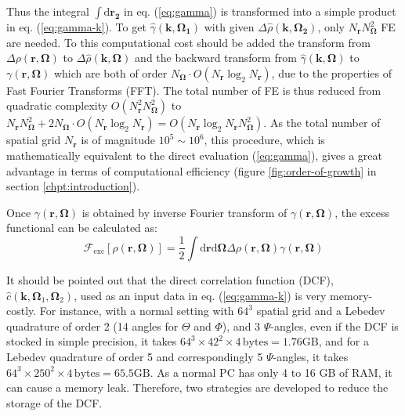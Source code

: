 Thus the integral $\int\mathrm{d}\mathbf{r_{2}}$ in eq. (\ref{eq:gamma})
is transformed into a simple product in eq. (\ref{eq:gamma-k}). To
get $\hat{\gamma}(\mathbf{k},\mathbf{\Omega_{1}})$ with given $\Delta\hat{\rho}(\mathbf{k},\mathbf{\Omega_{2}})$,
only $N_{\mathbf{r}}N_{\mathbf{\Omega}}^{2}$ FE are needed. To this
computational cost should be added the transform from $\Delta\rho(\mathbf{r},\mathbf{\Omega})$
to $\Delta\hat{\rho}(\mathbf{k},\mathbf{\Omega})$ and the backward
transform from $\hat{\gamma}(\mathbf{k},\mathbf{\Omega})$ to $\gamma(\mathbf{r},\mathbf{\Omega})$
which are both of order $N_{\mathbf{\Omega}}\cdot O(N_{\mathbf{r}}\log_{2}N_{\mathbf{r}})$,
due to the properties of Fast Fourier Transforms (FFT). The total
number of FE is thus reduced from quadratic complexity $O(N_{\mathbf{r}}^{2}N_{\mathbf{\Omega}}^{2})$
to $N_{\mathbf{r}}N_{\mathbf{\Omega}}^{2}+2N_{\mathbf{\Omega}}\cdot O(N_{\mathbf{r}}\log_{2}N_{\mathbf{r}})=O(N_{\mathbf{r}}\log_{2}N_{\mathbf{r}}N_{\mathbf{\Omega}}^{2})$.
As the total number of spatial grid $N_{\mathbf{r}}$ is of magnitude
$10^{5}\sim10^{6}$, this procedure, which is mathematically equivalent
to the direct evaluation (\ref{eq:gamma}), gives a great advantage
in terms of computational efficiency (figure \ref{fig:order-of-growth}
in section \ref{chpt:introduction}).

Once $\gamma(\mathbf{r},\mathbf{\Omega})$ is obtained by inverse
Fourier transform of $\gamma(\mathbf{r},\mathbf{\Omega})$, the excess
functional can be calculated as:
\begin{equation}
\mathcal{F}_{\mathrm{exc}}[\rho(\mathbf{r},\mathbf{\Omega})]=\frac{1}{2}\int\mathrm{d}\mathbf{r}\mathrm{d}\mathbf{\Omega}\Delta\rho(\mathbf{r},\mathbf{\Omega})\gamma(\mathbf{r},\mathbf{\Omega})
\end{equation}


It should be pointed out that the direct correlation function (DCF),
$\hat{c}(\mathbf{k},\mathbf{\Omega}_{1},\mathbf{\Omega}_{2})$, used
as an input data in eq. (\ref{eq:gamma-k}) is very memory-costly.
For instance, with a normal setting with $64^{3}$ spatial grid and
a Lebedev quadrature of order 2 (14 angles for $\Theta$ and $\Phi$),
and 3 $\Psi$-angles, even if the DCF is stocked in simple precision,
it takes $64^{3}\times42^{2}\times4\,\mathrm{bytes}=1.76\mathrm{GB}$,
and for a Lebedev quadrature of order 5 and correspondingly 5 $\Psi$-angles,
it takes $64^{3}\times250^{2}\times4\,\mathrm{bytes}=65.5\mathrm{GB}$.
As a normal PC has only 4 to 16 GB of RAM, it can cause a memory leak.
Therefore, two strategies are developed to reduce the storage of the
DCF.


